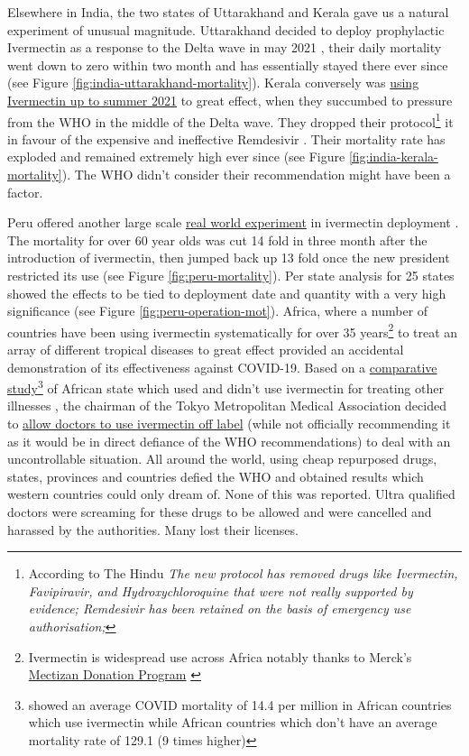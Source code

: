 \documentclass[11pt,a4paper,notitlepage]{report}
\begin{document}
Elsewhere in India, the two states of Uttarakhand and Kerala gave us a natural experiment of unusual magnitude. Uttarakhand decided to deploy prophylactic Ivermectin as a response to the Delta wave in may 2021 \cite{economictimes12052021}, their daily mortality went down to zero within two month and has essentially stayed there ever since (see Figure \ref{fig:india-uttarakhand-mortality}). Kerala conversely was \href{https://dhs.kerala.gov.in/wp-content/uploads/2021/04/Kerala-State-COVID-19-guidelines-Version-3.pdf}{using Ivermectin up to summer 2021} \cite{keralagov24042021} to great effect, when they succumbed to pressure from the WHO in the middle of the Delta wave. They dropped their protocol\footnote{According to The Hindu \cite{hindu06082021} \textit{The new protocol has removed drugs like Ivermectin, Favipiravir, and Hydroxychloroquine that were not really supported by evidence; Remdesivir has been retained on the basis of emergency use authorisation;}} it in favour of the expensive and ineffective Remdesivir \cite{hindu06082021}. Their mortality rate has exploded and remained extremely high ever since (see Figure \ref{fig:india-kerala-mortality}). The WHO didn't consider their recommendation might have been a factor.   

Peru offered another large scale \href{ https://osf.io/9egh4/}{real world experiment} in ivermectin deployment \cite{Chamie2021}. The mortality for over 60 year olds was cut 14 fold in three month after the introduction of ivermectin, then jumped back up 13 fold once the new president restricted its use (see Figure \ref{fig:peru-mortality}). Per state analysis for 25 states showed the effects to be tied to deployment date and quantity with a very high significance (see Figure \ref{fig:peru-operation-mot}). Africa, where a number of countries have been using ivermectin systematically for over 35 years\footnote{Ivermectin is widespread use across Africa notably thanks to Merck's \href{https://www.merck.com/stories/mectizan/}{Mectizan Donation Program} \cite{merck06012021}} to treat an array of different tropical diseases to great effect provided an accidental demonstration of its effectiveness against COVID-19. Based on a \href{https://www.medrxiv.org/content/early/2021/03/26/2021.03.26.21254377.full.pdf}{comparative study}\footnote{\citet{Tanioka2021.03.26.21254377} showed an average COVID mortality of 14.4 per million in African countries which use ivermectin while African countries which don't have an average mortality rate of 129.1 (9 times higher)} of African state which used and didn’t use ivermectin for treating other illnesses \cite{Tanioka2021.03.26.21254377}, the chairman of the Tokyo Metropolitan Medical Association decided to \href{https://www.tokyo-np.co.jp/article/123988}{allow doctors to use ivermectin off label} \cite{tokyoweb13082021} (while not officially recommending it as it would be in direct defiance of the WHO recommendations) to deal with an uncontrollable situation. All around the world, using cheap repurposed drugs, states, provinces and countries defied the WHO and obtained results which western countries could only dream of. None of this was reported. Ultra qualified doctors were screaming for these drugs to be allowed and were cancelled and harassed by the authorities. Many lost their licenses. 
\end{document}
